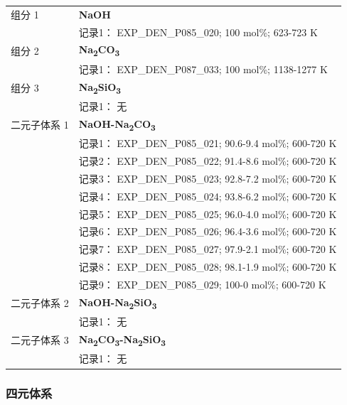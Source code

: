 \documentclass[12pt]{article}
\begin{document}
{\begin{longtable}[]{@{}
  >{\raggedright\arraybackslash}p{}
  >{\raggedright\arraybackslash}p{}@{}}
组分 1  & \textbf{NaOH} \\
 & 记录1： EXP\_DEN\_P085\_020; 100 mol\%; 623-723 K  \\

组分 2  & \textbf{Na\textsubscript{2}CO\textsubscript{3}} \\
 & 记录1： EXP\_DEN\_P087\_033; 100 mol\%; 1138-1277 K  \\

组分 3 & \textbf{Na\textsubscript{2}SiO\textsubscript{3}} \\
 & 记录1： 无 \\
二元子体系 1  & \textbf{NaOH-Na\textsubscript{2}CO\textsubscript{3}} \\
 & 记录1： EXP\_DEN\_P085\_021; 90.6-9.4 mol\%; 600-720 K \\
 & 记录2： EXP\_DEN\_P085\_022; 91.4-8.6 mol\%; 600-720 K \\
 & 记录3： EXP\_DEN\_P085\_023; 92.8-7.2 mol\%; 600-720 K \\
 & 记录4： EXP\_DEN\_P085\_024; 93.8-6.2 mol\%; 600-720 K \\
 & 记录5： EXP\_DEN\_P085\_025; 96.0-4.0 mol\%; 600-720 K \\
 & 记录6： EXP\_DEN\_P085\_026; 96.4-3.6 mol\%; 600-720 K \\
 & 记录7： EXP\_DEN\_P085\_027; 97.9-2.1 mol\%; 600-720 K \\
 & 记录8： EXP\_DEN\_P085\_028; 98.1-1.9 mol\%; 600-720 K \\
 & 记录9： EXP\_DEN\_P085\_029; 100-0 mol\%; 600-720 K  \\

二元子体系 2 & \textbf{NaOH-Na\textsubscript{2}SiO\textsubscript{3}} \\
 & 记录1： 无 \\
二元子体系 3 & \textbf{Na\textsubscript{2}CO\textsubscript{3}-Na\textsubscript{2}SiO\textsubscript{3}} \\
 & 记录1： 无 \\
\end{longtable}
}

\subsubsection*{四元体系}\label{quaternary-system-2}
\end{document}
